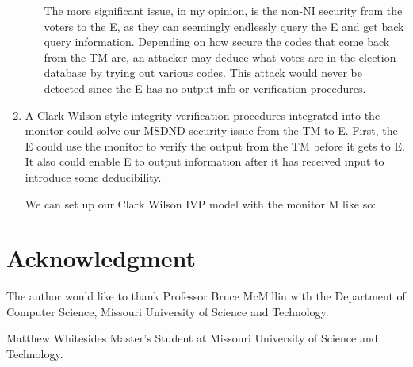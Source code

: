 \documentclass[journal,onecolumn]{IEEEtran}
\begin{document}
\begin{enumerate}
\begin{enumerate}
      The more significant issue, in my opinion, is the non-NI security from the voters to the E, as they can seemingly endlessly query the E and get back query information. Depending on how secure the codes that come back from the TM are, an attacker may deduce what votes are in the election database by trying out various codes. This attack would never be detected since the E has no output info or verification procedures. 

    \end{enumerate}
    \item A Clark Wilson style integrity verification procedures integrated into the monitor could solve our MSDND security issue from the TM to E. First, the E could use the monitor to verify the output from the TM before it gets to E. It also could enable E to output information after it has received input to introduce some deducibility. 
    
    We can set up our Clark Wilson IVP model with the monitor M like so:
\end{enumerate}




\section*{Acknowledgment}
The author would like to thank Professor Bruce McMillin with the Department of Computer Science, Missouri University of Science and Technology.

\ifCLASSOPTIONcaptionsoff
  \newpage
\fi

\begin{IEEEbiographynophoto}{Matthew Whitesides}
  Master's Student at Missouri University of Science and Technology.
\end{IEEEbiographynophoto}

\end{document}
